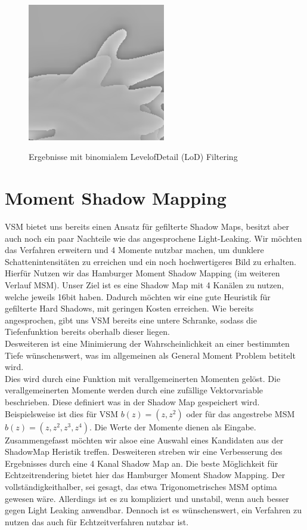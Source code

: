 \documentclass[runningheaders,a4paper]{llncs}
\begin{document}
\begin{figure}[H]
{		\includegraphics[width = 6cm]{vo_assets/area/zoomed/shinyMMFilter_on1.png}
		\label{ref:SBMF_on_close}
	}
	\caption{Ergebnisse mit binomialem LevelofDetail (LoD) Filtering}
	\label{ref:SBMF}
\end{figure}

\section{Moment Shadow Mapping}
VSM bietet uns bereits einen Ansatz für gefilterte Shadow Maps, besitzt aber auch noch ein paar Nachteile wie das angesprochene Light-Leaking. Wir möchten das Verfahren erweitern und 4 Momente nutzbar machen, um dunklere Schattenintensitäten zu erreichen und ein noch hochwertigeres Bild zu erhalten.\\
Hierfür Nutzen wir das Hamburger Moment Shadow Mapping (im weiteren Verlauf MSM).
Unser Ziel ist es eine Shadow Map mit 4 Kanälen zu nutzen, welche jeweils 16bit haben. Dadurch möchten wir eine gute Heuristik für gefilterte Hard Shadows, mit geringen Kosten erreichen. Wie bereits angesprochen, gibt uns VSM bereits eine untere Schranke, sodass die Tiefenfunktion bereits oberhalb dieser liegen.\\
Desweiteren ist eine Minimierung der Wahrscheinlichkeit an einer bestimmten Tiefe wünschenswert, was im allgemeinen als General Moment Problem betitelt wird.\\
Dies wird durch eine Funktion mit verallgemeinerten Momenten gelöst. Die verallgemeinerten Momente werden durch eine zufällige Vektorvariable beschrieben. Diese definiert was in der Shadow Map gespeichert wird. Beispielsweise ist dies für VSM $b(z) = (z,z^2)$ oder für das angestrebe MSM $b(z) = (z,z^2,z^3,z^4)$. Die Werte der Momente dienen als Eingabe.\\
Zusammengefasst möchten wir alsoe eine Auswahl eines Kandidaten aus der ShadowMap Heristik treffen. Desweiteren streben wir eine Verbesserung des Ergebnisses durch eine 4 Kanal Shadow Map an. Die beste Möglichkeit für Echtzeitrendering bietet hier das Hamburger Moment Shadow Mapping. Der vollständigkeithalber, sei gesagt, das etwa Trigonometrisches MSM optima gewesen wäre. Allerdings ist es zu kompliziert und unstabil, wenn auch besser gegen Light Leaking anwendbar. Dennoch ist es wünschenswert, ein Verfahren zu nutzen das auch für Echtzeitverfahren nutzbar ist.\cite{msm}\\
\end{document}
